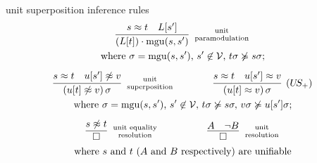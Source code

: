 \begin{exampleblock}{unit superposition inference rules}
\begin{gather*}
	\infer
	[\text{unit}\atop\text{paramodulation}]
	{(L[t])\cdot\mgu(s,s')}
	{s\foEQ t&L[s']}
\\\text{
where $\sigma=\mgu(s,s')$,
$s'\not\in\mcV$,
$t\sigma\not\succcurlyeq s\sigma$;
}\\[0.5em]
%
	\infer
	[\text{unit}\atop\text{superposition}]
	{(u[t]\foNEQ v)\,\sigma}
	{s\foEQ t&u[s']\foNEQ v}
	\qquad\qquad
	\infer
	[(U\!S_+)]
	{(u[t]\foEQ v)\,\sigma}
	{s\foEQ t&u[s']\foEQ v}
\\\text{
where $\sigma=\mgu(s,s')$,
$s'\not\in\mathcal{V},$
$t\sigma\not\succcurlyeq s\sigma,$
$v\sigma\not\succcurlyeq u[s']\sigma$;
}\\[0.5em]
%
	\infer
	[\text{unit equality}\atop\text{resolution}]
	{\emptyclause}
	{s\foNEQ t}
	\quad\quad\quad\qquad
	\infer
	[\text{unit}\atop\text{resolution}]
	{\emptyclause}
	{A&\lnot B}\\
\text{
where $s$ and $t$ ($A$ and $B$ respectively) are unifiable
}
\end{gather*}

\end{exampleblock}